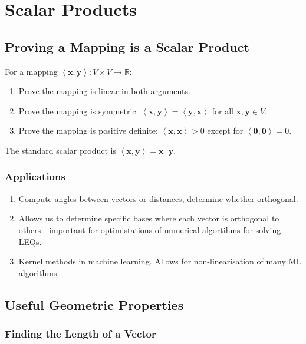 \documentclass[10pt,twoside,twocolumn]{article}
\newcommand{\R}[0]{\mathds{R}} %
\begin{document}
\section{Scalar Products}


\subsection{Proving a Mapping is a Scalar Product}

For a mapping $\left\langle \mathbf{x},\mathbf{y}\right\rangle :V\times V\rightarrow\R$: 
\begin{enumerate}
\item Prove the mapping is linear in both arguments. 
\item Prove the mapping is symmetric: $\left\langle \mathbf{x},\mathbf{y}\right\rangle =\left\langle \mathbf{y},\mathbf{x}\right\rangle $
for all $\mathbf{x},\mathbf{y}\in V$. 
\item Prove the mapping is positive definite: $\left\langle \mathbf{x},\mathbf{x}\right\rangle >0$
except for $\left\langle \mathbf{0},\mathbf{0}\right\rangle =0$. 
\end{enumerate}
The standard scalar product is $\left\langle \mathbf{x},\mathbf{y}\right\rangle =\mathbf{x}^{\top}\mathbf{y}$.


\subsubsection{Applications}
\begin{enumerate}
\item Compute angles between vectors or distances, determine whether orthogonal.
\item Allows us to determine specific bases where each vector is orthogonal
to others - important for optimistations of numerical algortihms for
solving LEQs.
\item Kernel methods in machine learning. Allows for non-linearisation of
many ML algorithms.
\end{enumerate}

\subsection{Useful Geometric Properties}


\subsubsection{Finding the Length of a Vector}
\end{document}
